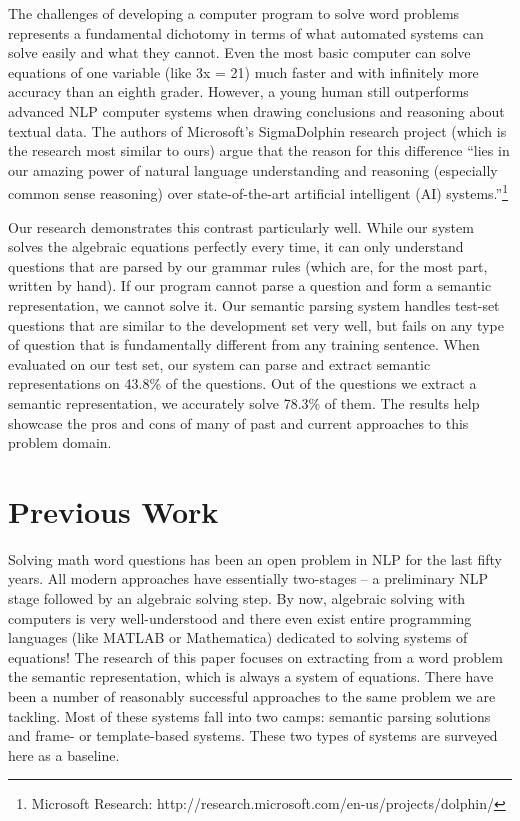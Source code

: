 \documentclass[11pt]{article}
\begin{document}
The challenges of developing a computer program to solve word problems represents a fundamental dichotomy in terms of what automated systems can solve easily and what they cannot. Even the most basic computer can solve equations of one variable (like 3x = 21) much faster and with infinitely more accuracy than an eighth grader. However, a young human still outperforms advanced NLP computer systems when drawing conclusions and reasoning about textual data. The authors of Microsoft’s SigmaDolphin research project (which is the research most similar to ours) argue that the reason for this difference ``lies in our amazing power of natural language understanding and reasoning (especially common sense reasoning) over state-of-the-art artificial intelligent (AI) systems.''\footnote{Microsoft Research: http://research.microsoft.com/en-us/projects/dolphin/}

Our research demonstrates this contrast particularly well. While our system solves the algebraic equations perfectly every time, it can only understand questions that are parsed by our grammar rules (which are, for the most part, written by hand). If our program cannot parse a question and form a semantic representation, we cannot solve it. Our semantic parsing system handles test-set questions that are similar to the development set very well, but fails on any type of question that is fundamentally different from any training sentence. When evaluated on our test set, our system can parse and extract semantic representations on 43.8\% of the questions. Out of the questions we extract a semantic representation, we accurately solve 78.3\% of them. The results help showcase the pros and cons of many of past and current approaches to this problem domain.

\section{Previous Work}
Solving math word questions has been an open problem in NLP for the last fifty years. All modern approaches have essentially two-stages -- a preliminary NLP stage followed by an algebraic solving step. By now, algebraic solving with computers is very well-understood and there even exist entire programming languages (like MATLAB or Mathematica) dedicated to solving systems of equations! The research of this paper focuses on extracting from a word problem the semantic representation, which is always a system of equations. There have been a number of reasonably successful approaches to the same problem we are tackling. Most of these systems fall into two camps: semantic parsing solutions and frame- or template-based systems. These two types of systems are surveyed here as a baseline.
\end{document}
